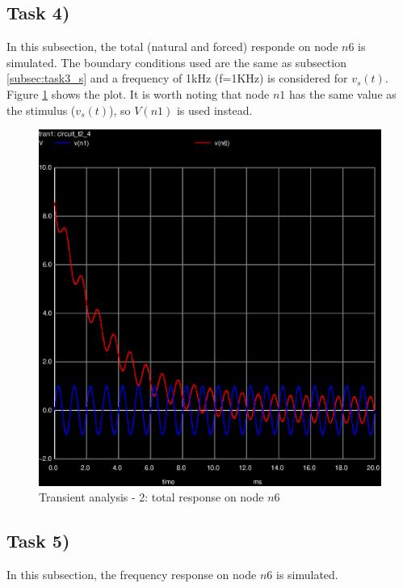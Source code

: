 \subsection{Task 4)}
\label{subsec:task4_s}

In this subsection, the total (natural and forced) responde on node $n6$ is simulated. The boundary
conditions used are the same as subsection \ref{subsec:task3_s} and a frequency of 1kHz (f=1KHz) is
considered for $v_s(t)$. Figure \ref{fig:trans-2} shows the plot. It is worth noting that node $n1$ has
the same value as the stimulus ($v_s(t)$), so $V(n1)$ is used instead.

\begin{figure}[ht]
	\centering
	\includegraphics[width=0.55\linewidth]{trans-2.eps}
	\caption{Transient analysis - 2: total response on node $n6$}
\label{fig:trans-2}
\end{figure}


\subsection{Task 5)}
\label{subsec:task5_s}

In this subsection, the frequency response on node $n6$ is simulated.

